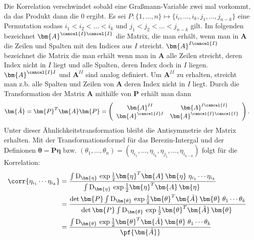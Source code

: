 \noindent Die Korrelation verschwindet sobald eine Graßmann-Variable zwei mal vorkommt, da das Produkt dann die 0 ergibt. Es sei $P: \{1,\dots, n\} \mapsto \{i_i, \dots, i_k, j_1, \dots, j_{n-k}\}$ eine Permutation sodass $i_1 < i_2 < \dots < i_{k}$ und $j_1 < j_2 < \dots < j_{n-k}$ gilt. Im folgenden bezeichnet $\bm{A}^{\cancel{I}\cancel{I}}$ die Matrix, die man erhält, wenn man in $\bm{A}$ die Zeilen und Spalten mit den Indices aus $I$ streicht. $\bm{A}^{I \cancel{I}}$ bezeichnet die Matrix die man erhält wenn man in $\bm{A}$ alle Zeilen streicht, deren Index nicht in $I$ liegt und alle Spalten, deren Index doch in $I$ liegen. $\bm{A}^{\cancel{I} I}$ und $\bm{A}^{II}$ sind analog definiert. Um $\bm{A}^{II}$ zu erhalten, streicht man z.b. alle Spalten und Zeilen von $\bm{A}$ deren Index nicht in $I$ liegt.
Durch die Transformation der Matrix $\bm{A}$ mithilfe von $\bm{P}$ erhält man dann
\begin{equation}
   \bm{\tilde{A}} =  \bm{P}^T \bm{A} \bm{P} =
        \left( \begin{array}{cc}
        \bm{A}^{II}          & \bm{A}^{I \cancel{I}} \\
        \bm{A}^{\cancel{I} I} & \bm{A}^{\cancel{I} \cancel{I}}
        \end{array} \right).
\end{equation}
\noindent Unter dieser Ähnlichkeitstransformation bleibt die Antisymmetrie der Matrix erhalten. Mit der Transformationsformel für das Berezin-Intergal und der Definionen $ \bm{\theta} = \bm{P} \bm{\eta} $ bzw. $ (\theta_1, \dots, \theta_n) =  (\eta_{i_1}, \dots ,\eta_{i_k}, \eta_{j_1}, \dots, \eta_{i_{n-k}}) $ folgt für die Korrelation: 
\begin{align}
\corr{\eta_{i_1} \cdots \eta_{i_k}} 
    & = \frac{\int \mathrm{D}_{\bm{\eta}}\, \exp{ \frac{1}{2}\bm{\eta}^T \bm{A}\, \bm{\eta}\;}  \eta_{i_1}\cdots\eta_{i_k}}{\int \mathrm{D}_{\bm{\eta}} \,\exp{\frac{1}{2} \bm{\eta}^T \bm{A}\, \bm{\eta}\;}} \nonumber \\
    & =  \frac{ \det{\bm{P}} \int \mathrm{D}_{\bm{\theta}}\, \exp{ \frac{1}{2} \bm{\theta}^T \bm{\tilde{A}}\, \bm{\theta}\;}  \theta_{1}\cdots\theta_k}{\det{\bm{P}} \int \mathrm{D}_{\bm{\theta}} \,\exp{ \frac{1}{2} \bm{\theta}^T \bm{\tilde{A}}\, \bm{\theta}\;}} \nonumber \\
    & = \frac{ \int \mathrm{D}_{\bm{\theta}}\, \exp{ \frac{1}{2} \bm{\theta}^T \bm{\tilde{A}}\, \bm{\theta}\;}  \theta_{1}\cdots\theta_k}{\pf{\bm{\tilde{A}}}} \label{eq: transformed Korrelation}
\end{align}
